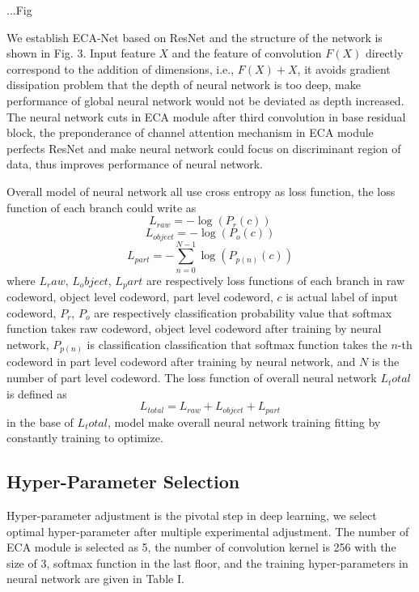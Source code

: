 \documentclass[conference]{IEEEtran}
\begin{document}
...Fig

We establish ECA-Net based on ResNet and the structure of the network is shown in Fig. 3. Input feature $X$ and the feature of convolution $F(X)$ directly correspond to the addition of dimensions, i.e., $F(X) + X$, it avoids gradient dissipation problem that the depth of neural network is too deep, make performance of global neural network would not be deviated as depth increased. The neural network cuts in ECA module after third convolution in base residual block, the preponderance of channel attention mechanism in ECA module perfects ResNet and make neural network could focus on discriminant region of data, thus improves performance of neural network.

Overall model of neural network all use cross entropy as loss function, the loss function of each branch could write as
\begin{equation}
	{L}_{raw} = -\log \left({P}_{r}({c})\right)
\end{equation}
\begin{equation}
	{L}_{object} = -\log \left({P}_{o}({c})\right)
\end{equation}
\begin{equation}
	{L}_{part} = -\sum_{n=0}^{N-1} \log \left(P_{p(n)}(c)\right)
\end{equation}
where $L_raw$, $L_object$, $L_part$ are respectively loss functions of each branch in raw codeword, object level codeword, part level codeword, $c$ is actual label of input codeword, $P_r$, $P_o$ are respectively classification probability value that softmax function takes raw codeword, object level codeword after training by neural network, $P_{p(n)}$ is classification classification that softmax function takes the $n$-th codeword in part level codeword after training by neural network, and $N$ is the number of part level codeword. The loss function of overall neural network $L_total$ is defined as
\begin{equation}
	L_{total}=L_{raw}+L_{object}+L_{part}
\end{equation}
in the base of $L_total$, model make overall neural network training fitting by constantly training to optimize.


\subsection{Hyper-Parameter Selection}
Hyper-parameter adjustment is the pivotal step in deep learning, we select optimal hyper-parameter after multiple experimental adjustment. The number of ECA module is selected as 5, the number of convolution kernel is 256 with the size of 3, softmax function in the last floor, and the training hyper-parameters in neural network are given in Table I.
\end{document}
